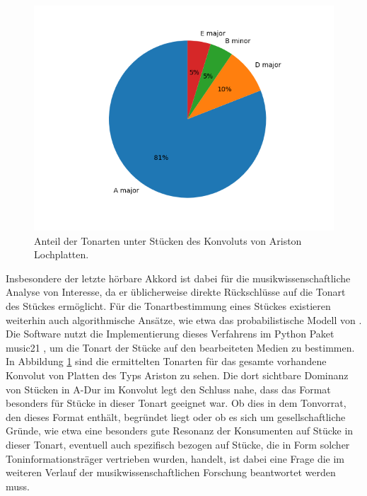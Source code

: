 \begin{figure}[t]
    \centering
    \includegraphics[width=\textwidth]{graphics/pie.png}
    \caption{Anteil der Tonarten unter Stücken des Konvoluts von Ariston Lochplatten.}
    \label{keys}
\end{figure}

Insbesondere der letzte hörbare Akkord ist dabei für die musikwissenschaftliche Analyse von Interesse, da er üblicherweise direkte Rückschlüsse auf die Tonart des Stückes ermöglicht.
Für die Tonartbestimmung eines Stückes existieren weiterhin auch algorithmische Ansätze, wie etwa das probabilistische Modell von \textcite[]{temperley_2002}.
Die  Software nutzt die Implementierung dieses Verfahrens im Python Paket music21 \parencite[]{music21}, um die Tonart der Stücke auf den bearbeiteten Medien zu bestimmen.
In Abbildung \ref{keys} sind die ermittelten Tonarten für das gesamte vorhandene Konvolut von Platten des Typs Ariston zu sehen.
Die dort sichtbare Dominanz von Stücken in A-Dur im Konvolut legt den Schluss nahe, dass das Format besonders für Stücke in dieser Tonart geeignet war.
Ob dies in dem Tonvorrat, den dieses Format enthält, begründet liegt oder ob es sich um gesellschaftliche Gründe, wie etwa eine besonders gute Resonanz der Konsumenten auf Stücke in dieser Tonart, eventuell auch spezifisch bezogen auf Stücke, die in Form solcher Toninformationsträger vertrieben wurden, handelt, ist dabei eine Frage die im weiteren Verlauf der musikwissenschaftlichen Forschung beantwortet werden muss.

